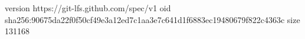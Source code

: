version https://git-lfs.github.com/spec/v1
oid sha256:90675da22f0f50cf49e3a12ed7c1aa3e7c641d1f6883ec19480679f822c4363c
size 131168
